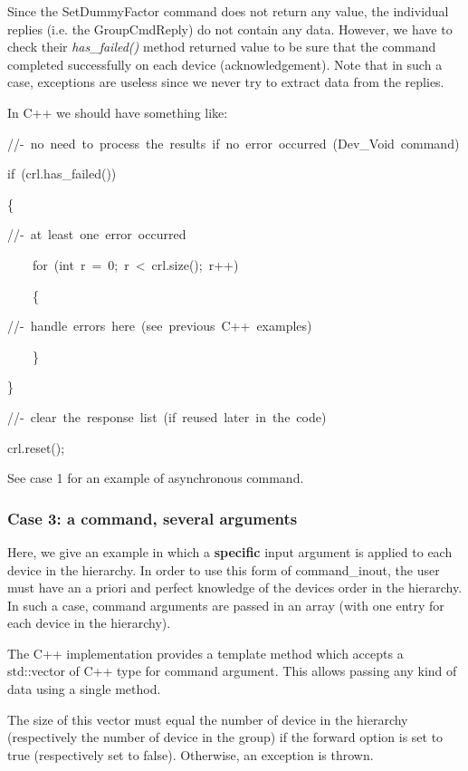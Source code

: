 Since the SetDummyFactor command does not return any value, the individual
replies (i.e. the GroupCmdReply) do not contain any data. However,
we have to check their \emph{has\_failed()} method
returned value to be sure that the command completed successfully
on each device (acknowledgement). Note that in such a case, exceptions
are useless since we never try to extract data from the replies. 

In C++ we should have something like: 


\begin{lyxcode}
//-~no~need~to~process~the~results~if~no~error~occurred~(Dev\_Void~command)

if~(crl.has\_failed())

\{

//-~at~least~one~error~occurred

~~~~for~(int~r~=~0;~r~<~crl.size();~r++)

~~~~\{

//-~handle~errors~here~(see~previous~C++~examples)

~~~~\}

\}

//-~clear~the~response~list~(if~reused~later~in~the~code)

crl.reset();
\end{lyxcode}


See case 1 for an example of asynchronous command.


\subsubsection{Case 3: a command, several arguments\label{sub:Case-3}}

Here, we give an example in which a \textbf{specific} input argument
is applied to each device in the hierarchy. In order to use this form
of command\_inout, the user must have an \textquotedbl{}a
priori\textquotedbl{} and \textquotedbl{}perfect\textquotedbl{} knowledge
of the devices order in the hierarchy. In such a case, command arguments
are passed in an \textquotedbl{}array\textquotedbl{} (with one entry
for each device in the hierarchy).

The C++ implementation provides a template method which accepts a
std::vector of \textquotedbl{}C++ type for command argument\textquotedbl{}.
This allows passing any kind of data using a single method.

The size of this vector must equal the number of device in the hierarchy
(respectively the number of device in the group) if the forward
option is set to true (respectively set to false). Otherwise, an exception
is thrown.

